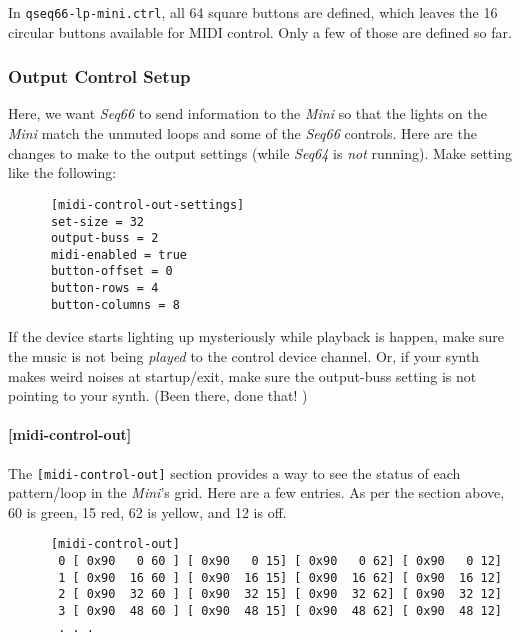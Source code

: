    In \texttt{qseq66-lp-mini.ctrl}, all 64 square buttons are defined, which
   leaves the 16 circular buttons available for MIDI control. Only a few of those
   are defined so far.

\subsubsection{Output Control Setup}
\label{subsubsec:launchpad_mini_output_control_setup}

   Here, we want \textsl{Seq66} to send information to the \textsl{Mini}
   so that the lights on the \textsl{Mini} match the unmuted loops and 
   some of the \textsl{Seq66} controls.  Here are the changes to make to the
   output settings (while \textsl{Seq64} is \textsl{not} running).
   Make setting like the following:

   \begin{verbatim}
      [midi-control-out-settings]
      set-size = 32
      output-buss = 2
      midi-enabled = true
      button-offset = 0
      button-rows = 4
      button-columns = 8
   \end{verbatim}

   If the device starts lighting up mysteriously while playback is happen, make
   sure the music is not being \textsl{played} to the control device channel.
   Or, if your synth makes weird noises at startup/exit, make
   sure the output-buss setting is not pointing to your synth.
   (Been there, done that! \smiley{})

\paragraph{[midi-control-out]}
\label{paragraph:patterns_midi_control_out}

   The \texttt{[midi-control-out]} section provides a way to see the status of
   each pattern/loop in the \textsl{Mini}'s grid.
   Here are a few entries. As per the
   section above, 60 is green, 15 red, 62 is yellow, and 12 is off.

   \begin{verbatim}
      [midi-control-out]
       0 [ 0x90   0 60 ] [ 0x90   0 15] [ 0x90   0 62] [ 0x90   0 12]
       1 [ 0x90  16 60 ] [ 0x90  16 15] [ 0x90  16 62] [ 0x90  16 12]
       2 [ 0x90  32 60 ] [ 0x90  32 15] [ 0x90  32 62] [ 0x90  32 12]
       3 [ 0x90  48 60 ] [ 0x90  48 15] [ 0x90  48 62] [ 0x90  48 12]
       . . .
   \end{verbatim}

